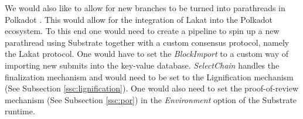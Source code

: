 We would also like to allow for new branches to be turned into parathreads in Polkadot \cite{wood2016polkadot}. This would allow for the integration of Lakat into the Polkadot ecosystem. To this end one would need to create a pipeline to spin up a new parathread using Substrate together with a custom consensus protocol, namely the Lakat protocol. One would have to set the \textit{BlockImport} to a custom way of importing new submits into the key-value database. \textit{SelectChain} handles the finalization mechanism and would need to be set to the Lignification mechanism (See Subsection \ref{ssc:lignification}). One would also need to set the proof-of-review mechanism (See Subsection \ref{ssc:por}) in the \textit{Environment} option of the Substrate runtime.

